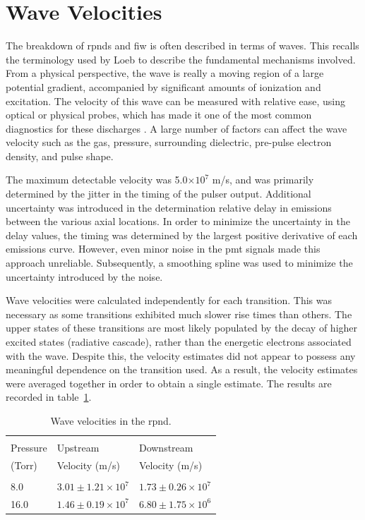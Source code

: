 \section{Wave Velocities}

The breakdown of \acs{rpnd}s and \acs{fiw} is often described in terms of waves.
This recalls the terminology used by Loeb \cite{Loeb1965} to describe the
fundamental mechanisms involved. From a physical perspective, the wave is really
a moving region of a large potential gradient, accompanied by significant
amounts of ionization and excitation. The velocity of this wave can be measured
with relative ease, using optical or physical probes, which has made it one of
the most common diagnostics for these discharges \cite{Vasilyak1994}. A large
number of factors can affect the wave velocity such as the gas, pressure,
surrounding dielectric, pre-pulse electron density, and pulse shape.

The maximum detectable velocity was 5.0$\times10^7$ m/s, and was primarily
determined by the jitter in the timing of the pulser output. Additional
uncertainty was introduced in the determination relative delay in emissions
between the various axial locations. In order to minimize the uncertainty in the
delay values, the timing was determined by the largest positive derivative of
each emissions curve. However, even minor noise in the \acs{pmt} signals made
this approach unreliable. Subsequently, a smoothing spline was used to minimize
the uncertainty introduced by the noise.

Wave velocities were calculated independently for each transition. This was
necessary as some transitions exhibited much slower rise times than others. The
upper states of these transitions are most likely populated by the decay of
higher excited states (radiative cascade), rather than the energetic electrons
associated with the wave. Despite this, the velocity estimates did not appear to
possess any meaningful dependence on the transition used. As a result, the
velocity estimates were averaged together in order to obtain a single estimate.
The results are recorded in table~\ref{tbl:velocities}.
\begin{table}
  \centering
  \caption{Wave velocities in the \acs{rpnd}.}
  \label{tbl:velocities}
  \begin{tabular}{lll}
    \toprule                                                      \\
    Pressure  & Upstream                & Downstream              \\
    (Torr)    & Velocity (m/s)          & Velocity (m/s)          \\
    \midrule                                                      \\
    8.0       & $3.01\pm1.21\times10^7$ & $1.73\pm0.26\times10^7$ \\
    16.0      & $1.46\pm0.19\times10^7$ & $6.80\pm1.75\times10^6$ \\
  \end{tabular}
\end{table}


